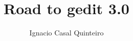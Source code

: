 \documentclass[a4paper,11pt,twoside]{book}
\author{Ignacio Casal Quinteiro}
\title{\textbf{\Huge{Road to gedit 3.0}}}
\begin{document}

\newcommand{\addwrapfigure}[4][\textwidth]{
  \begin{wrapfigure}{#2}{#1}
    \vspace{-20pt}
    \begin{center}
      \texttt{[image: \#3]}
    \end{center}
    \vspace{-20pt}
    \caption{#4}
    \vspace{-20pt}
  \end{wrapfigure}
}

\newcommand{\addfigure}[4][width=\textwidth]{
  \begin{figure}[H]
    \begin{center}
      \texttt{[image: \#2]}
      \caption[#3]{#3}\label{#4}
    \end{center}
  \end{figure}
}

\newcommand{\GNOME}{\textsc{Gnome}~}

\newcommand{\graybox}[1]{\colorbox{gray75}{#1}}


\newpage\thispagestyle{empty}
\cleardoublepage


\newpage\thispagestyle{empty}
\cleardoublepage

\pagestyle{fancy}
\fancyhf{}
\fancyhf[HR]{\thepage}
\fancyhf[HL]{\nouppercase\rightmark}

\frontmatter

\tableofcontents
\newpage\thispagestyle{empty}
\cleardoublepage
\listoffigures
\newpage\thispagestyle{empty}
\cleardoublepage
\listoftables
\newpage\thispagestyle{empty}
\cleardoublepage

\mainmatter
\end{document}
